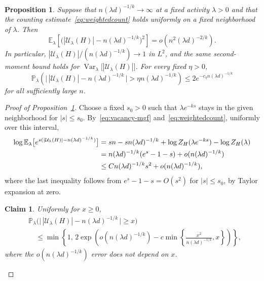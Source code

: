 \documentclass[11pt,reqno]{amsart}
\makeatletter
\numberwithin{equation}{section}
\theoremstyle{plain}
\newtheorem{proposition}[theorem]{Proposition}
\newtheorem{claim}{Claim}[section]
\newenvironment{claimproof}[1][Proof]{\par
    \pushQED{\qed}%
    \renewcommand{\qedsymbol}{$\blacksquare$}
    \normalfont \topsep6\p@\@plus6\p@\relax
    \trivlist
    \item[\hskip\labelsep
    \textit{#1}\@addpunct{.}~]\ignorespaces
}{%
    \popQED\endtrivlist\@endpefalse
}
\theoremstyle{definition}
\newcommand{\E}{\mathbb E}
\newcommand{\Prob}{\mathbb P}
\newcommand{\Var}{\operatorname{Var}}
\newcommand{\calU}{\mathcal U}
\makeatother
\begin{document}
\begin{proposition}\label{prop:variance}
    Suppose that $n(\lambda d)^{-1/k}\to\infty$ at a fixed activity $\lambda>0$ and that the counting estimate~\eqref{eq:weightedcount} holds uniformly on a fixed neighborhood of $\lambda$.
    Then
    \[
        \E_\lambda\left[\bigl(|\calU_\lambda(H)|-n(\lambda d)^{-1/k}\bigr)^2\right]=o(n^2(\lambda d)^{-2/k}).
    \]
    In particular, $|\calU_\lambda(H)|/(n(\lambda d)^{-1/k})\to1$ in $L^2$, and the same second-moment bound holds for $\Var_\lambda\bigl[|\calU_\lambda(H)|\bigr]$.
    For every fixed $\eta>0$,
    \[
        \Prob_\lambda(\bigl\lvert\,|\calU_\lambda(H)|-n(\lambda d)^{-1/k}\,\bigr\rvert>\eta n(\lambda d)^{-1/k})\le2e^{-c_\eta n(\lambda d)^{-1/k}}
    \]
    for all sufficiently large $n$.
\end{proposition}
\begin{proof}[Proof of Proposition~\ref{prop:variance}]
    Choose a fixed $s_0>0$ such that $\lambda e^{-ks}$ stays in the given neighborhood for $|s|\le s_0$.
    By~\eqref{eq:vacancy-mgf} and~\eqref{eq:weightedcount}, uniformly over this interval,
    \begin{align}
        \log\E_\lambda\bigl[e^{s(|\calU_\lambda(H)|-n(\lambda d)^{-1/k})}\bigr]
        &=sn-sn(\lambda d)^{-1/k}+\log Z_H(\lambda e^{-ks})-\log Z_H(\lambda)\notag\\
        &=n(\lambda d)^{-1/k}(e^s-1-s)+o(n(\lambda d)^{-1/k})\notag\\
        &\le Cn(\lambda d)^{-1/k}s^2+o(n(\lambda d)^{-1/k}),
    \label{eq:centered-vacancy-mgf}
    \end{align}
    where the last inequality follows from $e^s-1-s=O(s^2)$ for $|s|\le s_0$, by Taylor expansion at zero.
    \begin{claim}\label{clm:vacancy-tails}
        Uniformly for $x\ge0$,
        \[
            \begin{aligned}
                &\Prob_\lambda\bigl(\bigl\lvert\,|\calU_\lambda(H)|-n(\lambda d)^{-1/k}\,\bigr\rvert\ge x\bigr)\\
                &\quad\le\min\left\{1,\,2\exp\left(o(n(\lambda d)^{-1/k})
                -c\min\left\{\frac{x^2}{n(\lambda d)^{-1/k}},x\right\}\right)\right\},
            \end{aligned}
        \]
        where the $o(n(\lambda d)^{-1/k})$ error does not depend on $x$.
    \end{claim}
    \begin{claimproof}[Proof of Claim~\ref{clm:vacancy-tails}]

\end{claimproof}
\end{proof}
\end{document}
